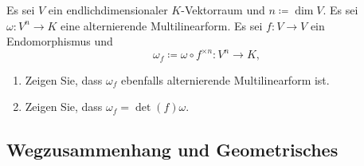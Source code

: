 

\begin{question}[subtitle = Multilineare Formen und die Determinante]{4}
  Es sei $V$ ein endlichdimensionaler $K$-Vektorraum und $n \coloneqq \dim V$.
  Es sei $\omega \colon V^n \to K$ eine alternierende Multilinearform.
  Es sei $f \colon V \to V$ ein Endomorphismus und
  \[
    \omega_f \coloneqq \omega \circ f^{\times n} \colon V^n \to K,
  \]
  \begin{enumerate}[leftmargin=*]
    \item
      Zeigen Sie, dass $\omega_f$ ebenfalls alternierende Multilinearform ist.
    \item
      Zeigen Sie, dass $\omega_f = \det(f) \omega$.
  \end{enumerate}
\end{question}










\subsection{Wegzusammenhang und Geometrisches}







